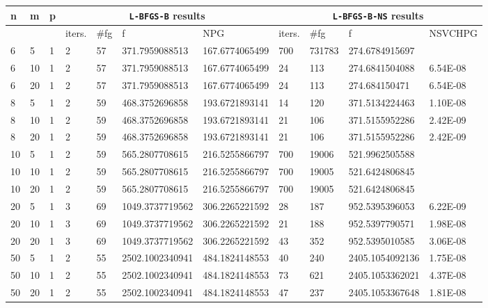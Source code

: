 \begin{table}
  \scriptsize
  \begin{center}
    \begin{tabular}{|l|l|l|l|l|l|l|l|l|l|l|}
      \hline
      n  &  m  &  p  & \multicolumn{4}{|c|}{\texttt{L-BFGS-B} results} & \multicolumn{4}{|c|}{\texttt{L-BFGS-B-NS} results} \\ \hline
      & &  & iters. & \#fg & f & NPG & iters. & \#fg & f & NSVCHPG \\ \hline
      6 & 5 & 1 & 2 & 57 & 371.7959088513 & 167.6774065499 & 700 & 731783 & 274.6784915697 & \\
      6 & 10 & 1 & 2 & 57 & 371.7959088513 & 167.6774065499 & 24 & 113 & 274.6841504088 & 6.54E-08\\
      6 & 20 & 1 & 2 & 57 & 371.7959088513 & 167.6774065499 & 24 & 113 & 274.684150471 & 6.54E-08\\
      8 & 5 & 1 & 2 & 59 & 468.3752696858 & 193.6721893141 & 14 & 120 & 371.5134224463 & 1.10E-08\\
      8 & 10 & 1 & 2 & 59 & 468.3752696858 & 193.6721893141 & 21 & 106 & 371.5155952286 & 2.42E-09\\
      8 & 20 & 1 & 2 & 59 & 468.3752696858 & 193.6721893141 & 21 & 106 & 371.5155952286 & 2.42E-09\\
      10 & 5 & 1 & 2 & 59 & 565.2807708615 & 216.5255866797 & 700 & 19006 & 521.9962505588 & \\
      10 & 10 & 1 & 2 & 59 & 565.2807708615 & 216.5255866797 & 700 & 19005 & 521.6424806845 & \\
      10 & 20 & 1 & 2 & 59 & 565.2807708615 & 216.5255866797 & 700 & 19005 & 521.6424806845 & \\
      20 & 5 & 1 & 3 & 69 & 1049.3737719562 & 306.2265221592 & 28 & 187 & 952.5395396053 & 6.22E-09\\
      20 & 10 & 1 & 3 & 69 & 1049.3737719562 & 306.2265221592 & 21 & 188 & 952.5397790571 & 1.98E-08\\
      20 & 20 & 1 & 3 & 69 & 1049.3737719562 & 306.2265221592 & 43 & 352 & 952.5395010585 & 3.06E-08\\
      50 & 5 & 1 & 2 & 55 & 2502.1002340941 & 484.1824148553 & 40 & 240 & 2405.1054092136 & 1.75E-08\\
      50 & 10 & 1 & 2 & 55 & 2502.1002340941 & 484.1824148553 & 73 & 621 & 2405.1053362021 & 4.37E-08\\
      50 & 20 & 1 & 2 & 55 & 2502.1002340941 & 484.1824148553 & 47 & 237 & 2405.1053367648 & 1.81E-08\\

\end{tabular}
\end{center}
\end{table}
